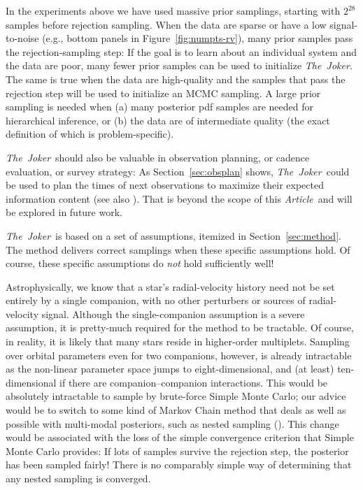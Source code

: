 \documentclass[manuscript, letterpaper]{aastex6}
\newcommand{\project}[1]{\textsl{#1}}
\newcommand{\samplername}{\project{The~Joker}}
\newcommand{\documentname}{\textsl{Article}}
\newcommand{\sectionname}{Section}
\newcommand{\figname}{Figure}
\newcommand{\resp}[1]{{\color{mahogany}#1}}
\begin{document}
In the experiments above we have used massive prior samplings, starting with
$2^{28}$ samples before rejection sampling.
When the data are sparse or have a low signal-to-noise (e.g., bottom panels in
\figname~\ref{fig:numpts-rv}), many prior samples pass the rejection-sampling
step:
If the goal is to learn about an individual system and the data are poor, many
fewer prior samples can be used to initialize \samplername.
The same is true when the data are high-quality and the samples that pass the
rejection step will be used to initialize an MCMC sampling.
A large prior sampling is needed when (a) many posterior pdf samples are needed
for hierarchical inference, or (b) the data are of intermediate quality (the
exact definition of which is problem-specific).

\samplername\ should also be valuable in observation planning, or cadence
evaluation, or survey strategy:
As \sectionname~\ref{sec:obsplan} shows,
\samplername\ could be used to plan the times of next observations to maximize
their expected information content \resp{(see also
\citealt{Loredo:2004,Ford:2004})}.
That is beyond the scope of this \documentname\ and will be explored in future
work.

\samplername\ is based on a set of assumptions, itemized in
\sectionname~\ref{sec:method}.
The method delivers correct samplings when these specific assumptions hold.
Of course, these specific assumptions do \emph{not} hold sufficiently well!

Astrophysically, we know that a star's radial-velocity history
need not be set entirely by a single companion, with no other perturbers or
sources of radial-velocity signal.
Although the single-companion assumption is a severe assumption, it
is pretty-much required for the method to be tractable.
Of course, in reality, it is likely that many stars reside in higher-order
multiplets.
Sampling over orbital parameters even for two companions, however, is already
intractable as the non-linear parameter space jumps to eight-dimensional, and
(at least) ten-dimensional if there are companion--companion interactions.
This would be absolutely intractable to sample by brute-force Simple
Monte Carlo; our advice would be to switch to some kind of Markov
Chain method that deals as well as possible with multi-modal
posteriors, such as nested sampling (\citealt{Skilling:2004, Brewer:2009}).
This change would be associated with the loss of the simple
convergence criterion that Simple Monte Carlo provides: If lots of
samples survive the rejection step, the posterior has been sampled
fairly!
There is no comparably simple way of determining that any nested
sampling is converged.
\end{document}
